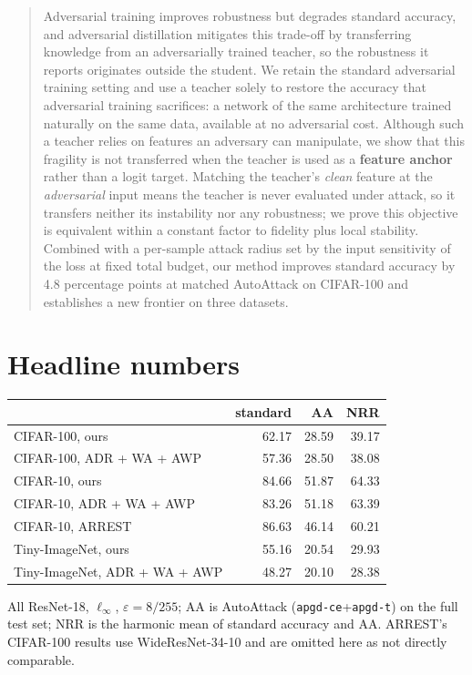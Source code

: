 \documentclass[11pt]{article}
\begin{document}
\begin{quote}
Adversarial training improves robustness but degrades standard accuracy, and adversarial distillation
mitigates this trade-off by transferring knowledge from an adversarially trained teacher, so the
robustness it reports originates outside the student. We retain the standard adversarial training
setting and use a teacher solely to restore the accuracy that adversarial training sacrifices: a
network of the same architecture trained naturally on the same data, available at no adversarial
cost. Although such a teacher relies on features an adversary can manipulate, we show that this
fragility is not transferred when the teacher is used as a \textbf{feature anchor} rather than a
logit target. Matching the teacher's \emph{clean} feature at the \emph{adversarial} input means the
teacher is never evaluated under attack, so it transfers neither its instability nor any robustness;
we prove this objective is equivalent within a constant factor to fidelity plus local stability.
Combined with a per-sample attack radius set by the input sensitivity of the loss at fixed total
budget, our method improves standard accuracy by 4.8 percentage points at matched AutoAttack on
CIFAR-100 and establishes a new frontier on three datasets.
\end{quote}

\section*{Headline numbers}

\begin{center}
\begin{tabular}{lrrr}
\hline
 & standard & AA & NRR \\
\hline
CIFAR-100, ours & 62.17 & 28.59 & 39.17 \\
CIFAR-100, ADR + WA + AWP & 57.36 & 28.50 & 38.08 \\
CIFAR-10, ours & 84.66 & 51.87 & 64.33 \\
CIFAR-10, ADR + WA + AWP & 83.26 & 51.18 & 63.39 \\
CIFAR-10, ARREST & 86.63 & 46.14 & 60.21 \\
Tiny-ImageNet, ours & 55.16 & 20.54 & 29.93 \\
Tiny-ImageNet, ADR + WA + AWP & 48.27 & 20.10 & 28.38 \\
\hline
\end{tabular}
\end{center}

\noindent
All ResNet-18, $\ell_\infty$, $\varepsilon=8/255$; AA is AutoAttack (\texttt{apgd-ce}+\texttt{apgd-t})
on the full test set; NRR is the harmonic mean of standard accuracy and AA. ARREST's CIFAR-100
results use WideResNet-34-10 and are omitted here as not directly comparable.
\end{document}
